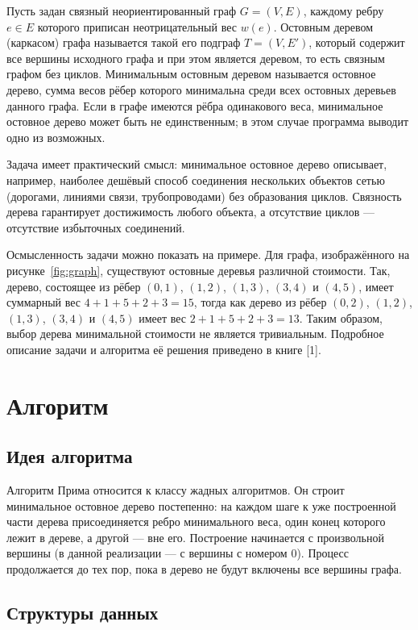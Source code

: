 \documentclass[a4paper,14pt]{extarticle}
\begin{document}
Пусть задан связный неориентированный граф $G=(V,E)$, каждому ребру
$e \in E$ которого приписан неотрицательный вес $w(e)$. Остовным деревом
(каркасом) графа называется такой его подграф $T=(V,E')$, который содержит
все вершины исходного графа и при этом является деревом, то есть связным
графом без циклов. Минимальным остовным деревом называется остовное дерево,
сумма весов рёбер которого минимальна среди всех остовных деревьев данного
графа. Если в графе имеются рёбра одинакового веса, минимальное остовное
дерево может быть не единственным; в этом случае программа выводит одно из
возможных.

Задача имеет практический смысл: минимальное остовное дерево описывает,
например, наиболее дешёвый способ соединения нескольких объектов сетью
(дорогами, линиями связи, трубопроводами) без образования циклов. Связность
дерева гарантирует достижимость любого объекта, а отсутствие циклов ---
отсутствие избыточных соединений.

Осмысленность задачи можно показать на примере. Для графа, изображённого на
рисунке~\ref{fig:graph}, существуют остовные деревья различной стоимости.
Так, дерево, состоящее из рёбер $(0,1)$, $(1,2)$, $(1,3)$, $(3,4)$ и $(4,5)$,
имеет суммарный вес $4+1+5+2+3=15$, тогда как дерево из рёбер $(0,2)$,
$(1,2)$, $(1,3)$, $(3,4)$ и $(4,5)$ имеет вес $2+1+5+2+3=13$. Таким образом,
выбор дерева минимальной стоимости не является тривиальным. Подробное
описание задачи и алгоритма её решения приведено в книге [1].

\section{Алгоритм}

\subsection{Идея алгоритма}

Алгоритм Прима относится к классу жадных алгоритмов. Он строит минимальное
остовное дерево постепенно: на каждом шаге к уже построенной части дерева
присоединяется ребро минимального веса, один конец которого лежит в дереве,
а другой --- вне его. Построение начинается с произвольной вершины (в данной
реализации --- с вершины с номером 0). Процесс продолжается до тех пор, пока в
дерево не будут включены все вершины графа.

\subsection{Структуры данных}
\end{document}
